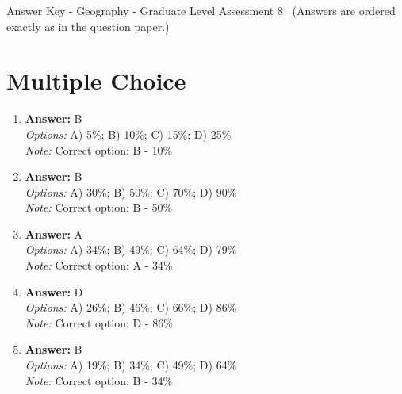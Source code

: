 \documentclass[12pt]{article}
\begin{document}
\begin{center}
Answer Key - Geography - Graduate Level Assessment 8 \
\small (Answers are ordered exactly as in the question paper.)
\end{center}

\section*{Multiple Choice}
\begin{enumerate}[label=\arabic*.]
\item \textbf{Answer:} B
\\ \textit{Options:} A) 5\%; B) 10\%; C) 15\%; D) 25\%
\\ \textit{Note:} Correct option: B - 10\%
\item \textbf{Answer:} B
\\ \textit{Options:} A) 30\%; B) 50\%; C) 70\%; D) 90\%
\\ \textit{Note:} Correct option: B - 50\%
\item \textbf{Answer:} A
\\ \textit{Options:} A) 34\%; B) 49\%; C) 64\%; D) 79\%
\\ \textit{Note:} Correct option: A - 34\%
\item \textbf{Answer:} D
\\ \textit{Options:} A) 26\%; B) 46\%; C) 66\%; D) 86\%
\\ \textit{Note:} Correct option: D - 86\%
\item \textbf{Answer:} B
\\ \textit{Options:} A) 19\%; B) 34\%; C) 49\%; D) 64\%
\\ \textit{Note:} Correct option: B - 34\%
\end{enumerate}
\end{document}
